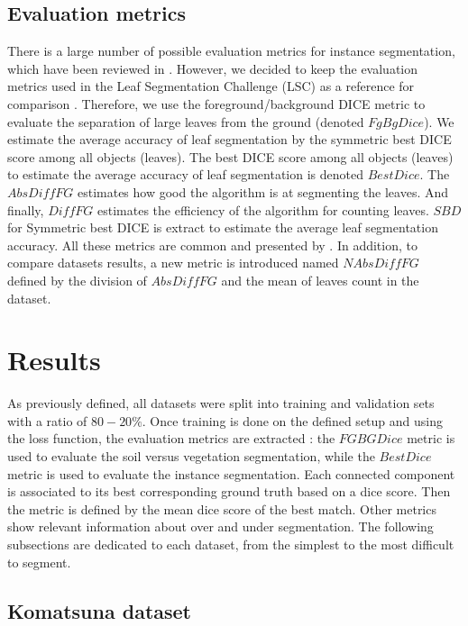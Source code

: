 \documentclass[../thesis.tex]{subfiles}
\begin{document}
    \subsection{Evaluation metrics}
    
    There is a large number of possible evaluation metrics for instance segmentation, which have been reviewed in \cite{scharr2016leaf}. However, we decided to keep the evaluation metrics used in the Leaf Segmentation Challenge (LSC) as a reference for comparison \cite{scharr2017computer, kulikov2018instance, bell2019leaf, ward2020scalable}. Therefore, we use the foreground/background DICE metric to evaluate the separation of large leaves from the ground (denoted $FgBgDice$). We estimate the average accuracy of leaf segmentation by the symmetric best DICE score among all objects (leaves). The best DICE score among all objects (leaves) to estimate the average accuracy of leaf segmentation is denoted $BestDice$. The $AbsDiffFG$  estimates how good the algorithm is at segmenting the leaves. And finally, $DiffFG$ estimates the efficiency of the algorithm for counting  leaves.
    $SBD$ for Symmetric best DICE is extract to estimate the average leaf segmentation accuracy.
    All these metrics are common and presented by \cite{scharr2016leaf}.
    In addition, to compare datasets results, a new metric is introduced named $NAbsDiffFG$ defined by the division of $AbsDiffFG$ and the mean of leaves count in the dataset.
    
    \section{Results}
    
    As previously defined, all datasets were split into training and validation sets with a ratio of $80-20\%$. Once training is done on the defined setup and using the loss function, the evaluation metrics are extracted :
    the $FGBGDice$ metric is used to evaluate the soil versus vegetation segmentation, while the $BestDice$ metric is used to evaluate the instance segmentation. Each connected component is associated to its best corresponding ground truth based on a dice score. Then the metric is defined by the mean dice score of the best match. Other metrics show relevant information about over and under segmentation. The following subsections are dedicated to each dataset, from the simplest to the most difficult to segment.
    
    \subsection{Komatsuna dataset}
    
\end{document}
